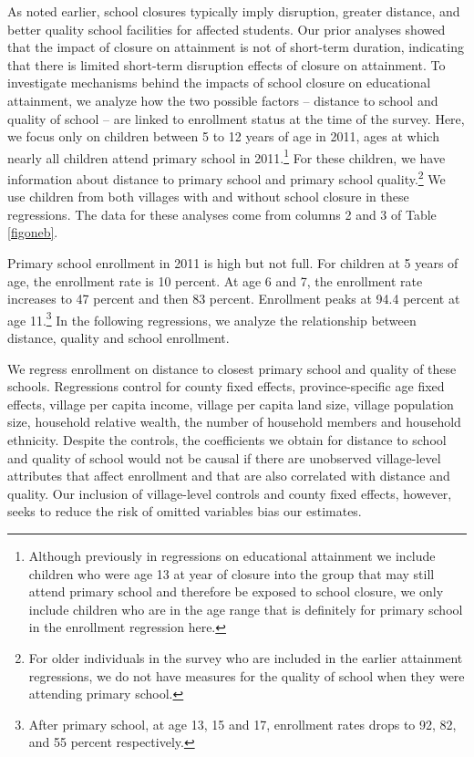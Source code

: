\documentclass[12pt,english]{article}
\begin{document}
As noted earlier, school closures typically imply disruption, greater distance, and better quality school facilities for affected students. Our prior analyses showed that the impact of closure on attainment is not of short-term duration, indicating that there is limited short-term disruption effects of closure on attainment. To investigate mechanisms behind the impacts of school closure on educational attainment, we analyze how the two possible factors --  distance to school and quality of school -- are linked to enrollment status at the time of the survey. Here, we focus only on children between 5 to 12 years of age in 2011, ages at which nearly all children attend primary school in 2011.\footnote{Although previously in regressions on educational attainment we include children who were age 13 at year of closure into the group that may still attend primary school and therefore be exposed to school closure, we only include children who are in the age range that is definitely for primary school in the enrollment regression here.} For these children, we have information about distance to primary school and primary school quality.\footnote{For older individuals in the survey who are included in the earlier attainment regressions, we do not have measures for the quality of school when they were attending primary school.} We use children from both villages with and without school closure in these regressions. The data for these analyses come from columns 2 and 3 of Table \ref{figoneb}.

Primary school enrollment in 2011 is high but not full. For children at 5 years of age, the enrollment rate is 10 percent. At age 6 and 7, the enrollment rate increases to 47 percent and then 83 percent. Enrollment peaks at 94.4 percent at age 11.\footnote{After primary school, at age 13, 15 and 17, enrollment rates drops to 92, 82, and 55 percent respectively.} In the following regressions, we analyze the relationship between distance, quality and school enrollment.

We regress enrollment on distance to closest primary school and quality of these schools. Regressions control for county fixed effects, province-specific age fixed effects, village per capita income, village per capita land size, village population size, household relative wealth, the number of household members and household ethnicity. Despite the controls, the coefficients we obtain for distance to school and quality of school would not be causal if there are unobserved village-level attributes that affect enrollment and that are also correlated with distance and quality. Our inclusion of village-level controls and county fixed effects, however, seeks to reduce the risk of omitted variables bias our estimates.
\end{document}
